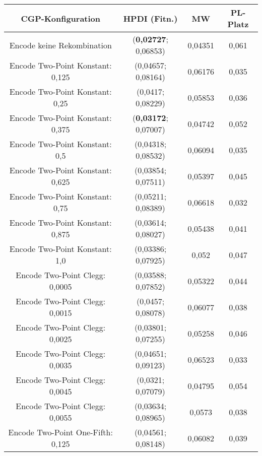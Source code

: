  \begin{table}[H]
	\centering
	\begin{tabular}{c | c | c | c}
		\textbf{CGP-Konfiguration} & \textbf{HPDI (Fitn.)} & \textbf{MW} & \textbf{PL-Platz}\\
		\hline
		Encode keine Rekombination & (\textbf{0,02727}; 0,06853) & \color{Green}0,04351\color{black} & \color{Green}0,061\color{black}\\
		\hline
		\hline
		Encode Two-Point Konstant: 0,125 & (0,04657; 0,08164) & \color{red}0,06176\color{black} & \color{red}0,035\color{black}\\
		\hline
		Encode Two-Point Konstant: 0,25 & (0,0417; 0,08229) & 0,05853 & 0,036\\
		\hline
		Encode Two-Point Konstant: 0,375 & (\textbf{0,03172}; 0,07007) & \color{Green}0,04742\color{black} & 0,052\\
		\hline
		Encode Two-Point Konstant: 0,5 & (0,04318; 0,08532) & 0,06094 & 0,035\\
		\hline
		Encode Two-Point Konstant: 0,625 & (0,03854; 0,07511) & 0,05397 & 0,045\\
		\hline
		Encode Two-Point Konstant: 0,75 & \color{Green}(0,05211; 0,08389)\color{black} & \color{red}0,06618\color{black} & \color{red}0,032\color{black}\\
		\hline
		Encode Two-Point Konstant: 0,875 & \color{red}(0,03614; 0,08027)\color{black} & 0,05438 & 0,041\\
		\hline
		Encode Two-Point Konstant: 1,0 & \color{red}(0,03386; 0,07925)\color{black} & 0,052 & 0,047\\
		\hline
		\hline
		Encode Two-Point Clegg: 0,0005 & (0,03588; 0,07852) & 0,05322 & 0,044\\
		\hline
		Encode Two-Point Clegg: 0,0015 & (0,0457; 0,08078) & 0,06077 & 0,038\\
		\hline
		Encode Two-Point Clegg: 0,0025 & (0,03801; 0,07255) & 0,05258 & 0,046\\
		\hline
		Encode Two-Point Clegg: 0,0035 & (0,04651; 0,09123) & \color{red}0,06523\color{black} & \color{red}0,033\color{black}\\
		\hline
		Encode Two-Point Clegg: 0,0045 & (0,0321; 0,07079) &\color{Green} 0,04795\color{black} &\color{Green} 0,054\color{black}\\
		\hline
		Encode Two-Point Clegg: 0,0055 & \color{red}(0,03634; 0,08965)\color{black} & 0,0573 & 0,038\\
		\hline
		\hline
		Encode Two-Point One-Fifth: 0,125 & (0,04561; 0,08148) & 0,06082 & 0,039\\

\end{tabular}
\end{table}

